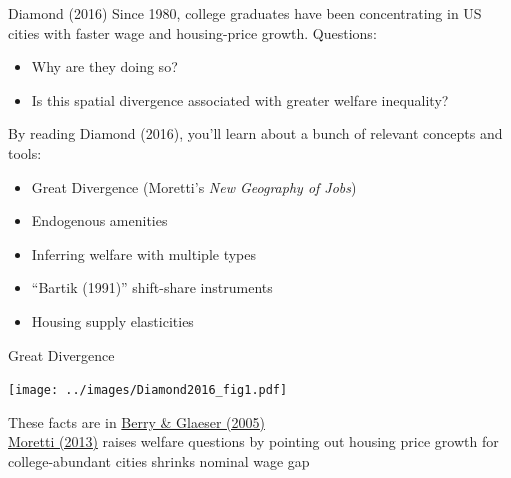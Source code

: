 \documentclass[10pt,notes=hide]{beamer}
\begin{document}
\begin{frame}{Diamond (2016)}
Since 1980, college graduates have been concentrating in US cities with faster wage and housing-price growth. Questions:
\begin{itemize}
	\item Why are they doing so?
	\item Is this spatial divergence associated with greater welfare inequality?
\end{itemize}
By reading Diamond (2016), you'll learn about a bunch of relevant concepts and tools:
\begin{itemize}
	\item Great Divergence (Moretti's \textit{New Geography of Jobs})
	\item Endogenous amenities
	\item Inferring welfare with multiple types
	\item ``Bartik (1991)'' shift-share instruments
	\item Housing supply elasticities
\end{itemize}
\end{frame}
\begin{frame}{Great Divergence}
\begin{center}
\texttt{[image: ../images/Diamond2016\_fig1.pdf]}\
\end{center}
\vspace{-4mm}
{\small
	These facts are in \href{https://onlinelibrary.wiley.com/doi/abs/10.1111/j.1435-5957.2005.00047.x}{Berry \& Glaeser (2005)} \\
\href{https://www.aeaweb.org/articles?id=10.1257/app.5.1.65}{Moretti (2013)} raises welfare questions by pointing out housing price growth for college-abundant cities shrinks nominal wage gap\par
}
\end{frame}
\end{document}
